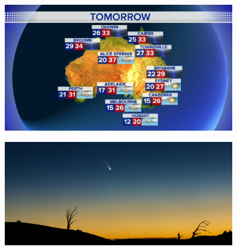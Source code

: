 \documentclass[10pt]{beamer}
\begin{document}
\begin{frame}
\begin{minipage}{0.34\textwidth}
\pause
\begin{figure}
\begin{center}
    \includegraphics[width=0.9\textwidth]{Imagen5.png}
\end{center}
\end{figure}
\end{minipage}
\begin{minipage}{0.34\textwidth}
\pause
\begin{figure}
\begin{center}
    \includegraphics[width=0.9\textwidth]{Imagen6.JPG}
\end{center}
\end{figure}
\end{minipage}



\end{frame}




\end{document}

